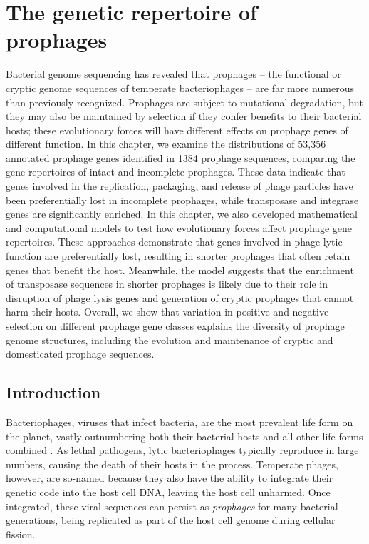 \chapter{The genetic repertoire of prophages}
 Bacterial genome sequencing has revealed that prophages – the functional or cryptic genome sequences of temperate bacteriophages – are far more numerous than previously recognized.  Prophages are subject to mutational degradation, but they may also be maintained by selection if they confer benefits to their bacterial hosts; these evolutionary forces will have different effects on prophage genes of different function. In this chapter, we examine the distributions of 53,356 annotated prophage genes identified in 1384 prophage sequences, comparing the gene repertoires of intact and incomplete prophages.  These data indicate that genes involved in the replication, packaging, and release of phage particles have been preferentially lost in incomplete prophages, while transposase and integrase genes are significantly enriched.  In this chapter, we also developed mathematical and computational models to test how evolutionary forces affect prophage gene repertoires.  These approaches demonstrate that genes involved in phage lytic function are preferentially lost, resulting in shorter prophages that often retain genes that benefit the host.  Meanwhile, the model suggests that the enrichment of transposase sequences in shorter prophages is likely due to their role in disruption of phage lysis genes and generation of cryptic prophages that cannot harm their hosts.  Overall, we show that variation in positive and negative selection on different prophage gene classes explains the diversity of prophage genome structures, including the evolution and maintenance of cryptic and domesticated prophage sequences. 
\section{Introduction}
Bacteriophages, viruses that infect bacteria, are the most prevalent life form on the planet, vastly outnumbering both their bacterial hosts and all other life forms combined \cite{bergh_high_1989, rohwer_global_2003, clokie_phages_2011}.  As lethal pathogens, lytic bacteriophages typically reproduce in large numbers, causing the death of their hosts in the process.  Temperate phages, however, are so-named because they also have the ability to integrate their genetic code into the host cell DNA, leaving the host cell unharmed.  Once integrated, these viral sequences can persist as \emph{prophages} for many bacterial generations, being replicated as part of the host cell genome during cellular fission.

